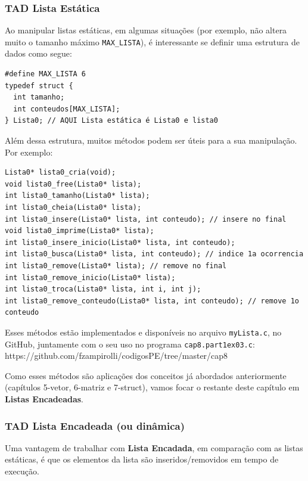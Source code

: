 \documentclass[12pt,a4paper]{article}
\begin{document}
    \hypertarget{tad-lista-estuxe1tica}{%
\subsubsection{TAD Lista Estática}\label{tad-lista-estuxe1tica}}

    Ao manipular listas estáticas, em algumas situações (por exemplo, não
altera muito o tamanho máximo \texttt{MAX\_LISTA}), é interessante se
definir uma estrutura de dados como segue:

\begin{verbatim}
#define MAX_LISTA 6
typedef struct {
  int tamanho;
  int conteudos[MAX_LISTA];
} Lista0; // AQUI Lista estática é Lista0 e lista0
\end{verbatim}

Além dessa estrutura, muitos métodos podem ser úteis para a sua
manipulação. Por exemplo:

\begin{verbatim}
Lista0* lista0_cria(void);
void lista0_free(Lista0* lista);
int lista0_tamanho(Lista0* lista);
int lista0_cheia(Lista0* lista);
int lista0_insere(Lista0* lista, int conteudo); // insere no final
void lista0_imprime(Lista0* lista);
int lista0_insere_inicio(Lista0* lista, int conteudo);
int lista0_busca(Lista0* lista, int conteudo); // indice 1a ocorrencia
int lista0_remove(Lista0* lista); // remove no final
int lista0_remove_inicio(Lista0* lista);
int lista0_troca(Lista0* lista, int i, int j);
int lista0_remove_conteudo(Lista0* lista, int conteudo); // remove 1o conteudo
\end{verbatim}

Esses métodos estão implementados e disponíveis no arquivo
\texttt{myLista.c}, no GitHub, juntamente com o seu uso no programa
\texttt{cap8.part1ex03.c}:
https://github.com/fzampirolli/codigosPE/tree/master/cap8

Como esses métodos são aplicações dos conceitos já abordados
anteriormente (capítulos 5-vetor, 6-matriz e 7-struct), vamos focar o
restante deste capítulo em \textbf{Listas Encadeadas}.

    \hypertarget{tad-lista-encadeada-ou-dinuxe2mica}{%
\subsubsection{TAD Lista Encadeada (ou
dinâmica)}\label{tad-lista-encadeada-ou-dinuxe2mica}}

    Uma vantagem de trabalhar com \textbf{Lista Encadada}, em comparação com
as listas estáticas, é que os elementos da lista são inseridos/removidos
em tempo de execução.
\end{document}
